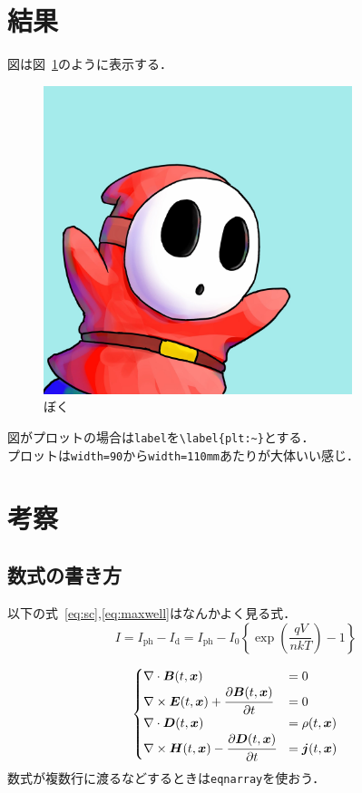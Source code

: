 \documentclass[autodetect-engine,dvipdfmx-if-dvi,ja=standard,a4paper,11pt,titlepage]{bxjsarticle}
\newcommand{\figref}[1]{図~\ref{#1}}
\newcommand{\equref}[1]{式~\eqref{#1}}
\newcommand{\mrm}[1]{\mbox{$_{\mathrm{#1}}$}}
\begin{document}
\section{結果}
図は\figref{fig:5ebec}のように表示する．
\begin{figure}[H]
  \centering
  \includegraphics[width=90mm]{../img/5ebec.jpg}
  \caption{ぼく}
  \label{fig:5ebec}
\end{figure}

図がプロットの場合は\verb+label+を\verb+\label{plt:~}+とする．\\
プロットは\verb+width=90+から\verb+width=110mm+あたりが大体いい感じ．
\section{考察}

\subsection{数式の書き方}

以下の\equref{eq:sc},\eqref{eq:maxwell}はなんかよく見る式．
\begin{equation}
  I = I\mrm{ph} - I\mrm{d} = I\mrm{ph} - I_0\left\{\exp\left(\frac{qV}{nkT}\right)-1\right\}
  \label{eq:sc}
\end{equation}

\begin{eqnarray}
  \begin{cases}
    \nabla \cdot \bm{B}(t,\bm{x}) &= 0 \\
    \nabla \times \bm{E}(t,\bm{x}) + {\cfrac {\partial \bm{B}(t,\bm{x})}{\partial t}} &= 0 \\
    \nabla \cdot \bm{D}(t,\bm{x}) &= \rho (t,\bm{x}) \\
    \nabla \times \bm{H}(t,\bm{x})-{\cfrac {\partial \bm{D}(t,\bm{x})}{\partial t}} &= \bm{j}(t,\bm{x})
    \label{eq:maxwell}
  \end{cases}
\end{eqnarray}
数式が複数行に渡るなどするときは\verb+eqnarray+を使おう．
\end{document}
